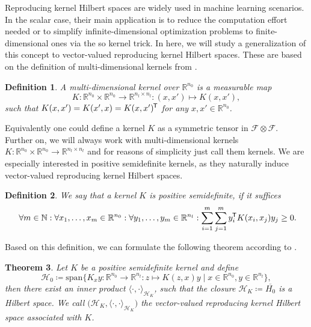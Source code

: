 \documentclass[11pt, a4paper]{article}
\newtheorem{theorem}{Theorem}[section]
\newtheorem{definition}[theorem]{Definition}
\newcommand{\N}{\mathbb{N}}
\newcommand{\R}{\mathbb{R}}
\newcommand{\F}{\mathcal{F}}
\renewcommand{\H}{\mathcal{H}}
\newcommand*{\tr}{^{\mkern-1.5mu\mathsf{T}}}
\begin{document}
Reproducing kernel Hilbert spaces are widely used in machine learning scenarios. In the scalar case, their main application is to reduce the computation effort needed or to simplify infinite-dimensional optimization problems to finite-dimensional ones via the so kernel trick. In here, we will study a generalization of this concept to vector-valued reproducing kernel Hilbert spaces. These are based on the definition of multi-dimensional kernels from \cite{NTK}.

\begin{definition}
A multi-dimensional kernel over $\R^{n_0}$ is a measurable map
\[ K: \R^{n_0} \times \R^{n_0} \to \R^{n_l \times n_l} : (x,x') \mapsto K(x,x'), \]
such that $K(x,x') = K(x',x) = K(x,x')\tr$ for any $x,x' \in \R^{n_0}$.
\end{definition}

Equivalently one could define a kernel $K$ as a symmetric tensor in $\F \otimes \F$. Further on, we will always work with multi-dimensional kernels $K: \R^{n_0} \times \R^{n_0} \to \R^{n_l \times n_l}$ and for reasons of simplicity just call them kernels. We are especially interested in positive semidefinite kernels, as they naturally induce vector-valued reproducing kernel Hilbert spaces.

\begin{definition}
We say that a kernel $K$ is positive semidefinite, if it suffices
\[ \forall m \in \N : \forall x_1, \dots, x_m \in \R^{n_0} : \forall y_1, \dots, y_m \in \R^{n_l}: \sum_{i=1}^{m} \sum_{j=1}^{m} y_i \tr K(x_i, x_j) y_j \geq 0. \]
\end{definition}

Based on this definition, we can formulate the following theorem according to \cite{RKHS}.

\begin{theorem} \label{thm:rkhs}
Let $K$ be a positive semidefinite kernel and define
\[ \H_0 \coloneq \text{span} \Big \{ K_xy : \R^{n_0} \to \R^{n_l} : z \mapsto K(z,x)y \mid x \in \R^{n_0}, y \in \R^{n_l} \Big \}, \]
then there exist an inner product $\langle \cdot, \cdot \rangle_{\H_K}$, such that the closure $\H_K \coloneq \overline{H_0}$ is a Hilbert space.
We call $\big (\H_K, \langle \cdot, \cdot \rangle_{\H_K} \big )$ the vector-valued reproducing kernel Hilbert space associated with $K$.
\end{theorem}
\end{document}

